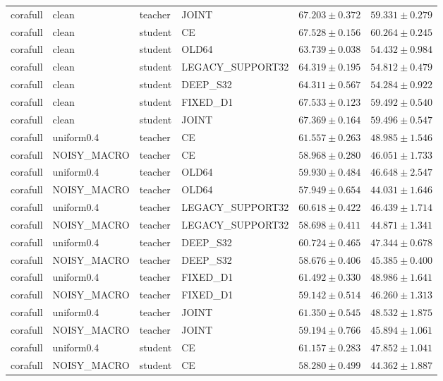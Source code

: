 \begin{longtable}{llllrr}
corafull & clean & teacher & JOINT & $67.203 \pm 0.372$ & $59.331 \pm 0.279$ \\
corafull & clean & student & CE & $67.528 \pm 0.156$ & $60.264 \pm 0.245$ \\
corafull & clean & student & OLD64 & $63.739 \pm 0.038$ & $54.432 \pm 0.984$ \\
corafull & clean & student & LEGACY\_SUPPORT32 & $64.319 \pm 0.195$ & $54.812 \pm 0.479$ \\
corafull & clean & student & DEEP\_S32 & $64.311 \pm 0.567$ & $54.284 \pm 0.922$ \\
corafull & clean & student & FIXED\_D1 & $67.533 \pm 0.123$ & $59.492 \pm 0.540$ \\
corafull & clean & student & JOINT & $67.369 \pm 0.164$ & $59.496 \pm 0.547$ \\
corafull & uniform0.4 & teacher & CE & $61.557 \pm 0.263$ & $48.985 \pm 1.546$ \\
corafull & NOISY\_MACRO & teacher & CE & $58.968 \pm 0.280$ & $46.051 \pm 1.733$ \\
corafull & uniform0.4 & teacher & OLD64 & $59.930 \pm 0.484$ & $46.648 \pm 2.547$ \\
corafull & NOISY\_MACRO & teacher & OLD64 & $57.949 \pm 0.654$ & $44.031 \pm 1.646$ \\
corafull & uniform0.4 & teacher & LEGACY\_SUPPORT32 & $60.618 \pm 0.422$ & $46.439 \pm 1.714$ \\
corafull & NOISY\_MACRO & teacher & LEGACY\_SUPPORT32 & $58.698 \pm 0.411$ & $44.871 \pm 1.341$ \\
corafull & uniform0.4 & teacher & DEEP\_S32 & $60.724 \pm 0.465$ & $47.344 \pm 0.678$ \\
corafull & NOISY\_MACRO & teacher & DEEP\_S32 & $58.676 \pm 0.406$ & $45.385 \pm 0.400$ \\
corafull & uniform0.4 & teacher & FIXED\_D1 & $61.492 \pm 0.330$ & $48.986 \pm 1.641$ \\
corafull & NOISY\_MACRO & teacher & FIXED\_D1 & $59.142 \pm 0.514$ & $46.260 \pm 1.313$ \\
corafull & uniform0.4 & teacher & JOINT & $61.350 \pm 0.545$ & $48.532 \pm 1.875$ \\
corafull & NOISY\_MACRO & teacher & JOINT & $59.194 \pm 0.766$ & $45.894 \pm 1.061$ \\
corafull & uniform0.4 & student & CE & $61.157 \pm 0.283$ & $47.852 \pm 1.041$ \\
corafull & NOISY\_MACRO & student & CE & $58.280 \pm 0.499$ & $44.362 \pm 1.887$ \\

\end{longtable}
